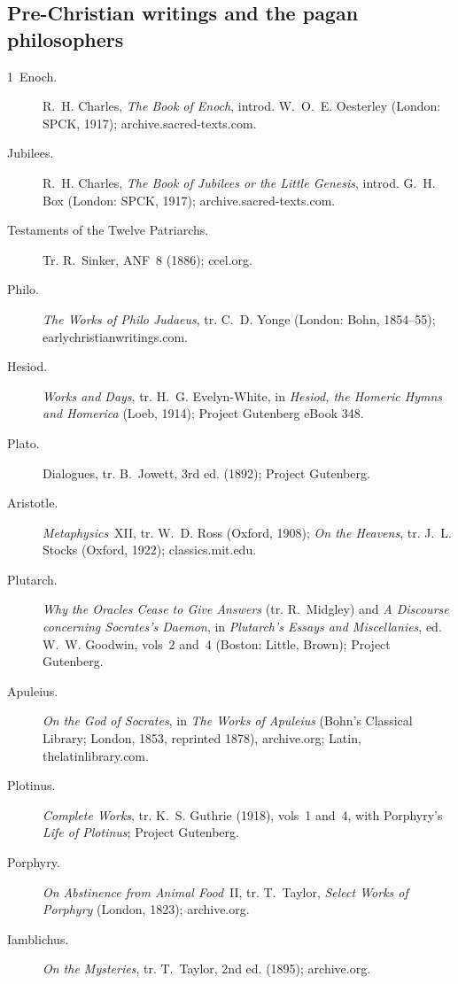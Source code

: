 \subsection*{Pre-Christian writings and the pagan philosophers}
\begin{description}
\item[1~Enoch.] R.~H. Charles, \emph{The Book of Enoch}, introd.
  W.~O.~E. Oesterley (London: SPCK, 1917); archive.sacred-texts.com.
\item[Jubilees.] R.~H. Charles, \emph{The Book of Jubilees or the Little
  Genesis}, introd. G.~H. Box (London: SPCK, 1917); archive.sacred-texts.com.
\item[Testaments of the Twelve Patriarchs.] Tr. R.~Sinker, ANF~8 (1886);
  ccel.org.
\item[Philo.] \emph{The Works of Philo Judaeus}, tr. C.~D. Yonge (London:
  Bohn, 1854--55); earlychristianwritings.com.
\item[Hesiod.] \emph{Works and Days}, tr. H.~G. Evelyn-White, in
  \emph{Hesiod, the Homeric Hymns and Homerica} (Loeb, 1914); Project
  Gutenberg eBook 348.
\item[Plato.] Dialogues, tr. B.~Jowett, 3rd ed. (1892); Project Gutenberg.
\item[Aristotle.] \emph{Metaphysics}~XII, tr. W.~D. Ross (Oxford, 1908);
  \emph{On the Heavens}, tr. J.~L. Stocks (Oxford, 1922); classics.mit.edu.
\item[Plutarch.] \emph{Why the Oracles Cease to Give Answers} (tr.
  R.~Midgley) and \emph{A Discourse concerning Socrates's Daemon}, in
  \emph{Plutarch's Essays and Miscellanies}, ed. W.~W. Goodwin, vols~2
  and~4 (Boston: Little, Brown); Project Gutenberg.
\item[Apuleius.] \emph{On the God of Socrates}, in \emph{The Works of
  Apuleius} (Bohn's Classical Library; London, 1853, reprinted 1878),
  archive.org; Latin, thelatinlibrary.com.
\item[Plotinus.] \emph{Complete Works}, tr. K.~S. Guthrie (1918), vols~1
  and~4, with Porphyry's \emph{Life of Plotinus}; Project Gutenberg.
\item[Porphyry.] \emph{On Abstinence from Animal Food}~II, tr. T.~Taylor,
  \emph{Select Works of Porphyry} (London, 1823); archive.org.
\item[Iamblichus.] \emph{On the Mysteries}, tr. T.~Taylor, 2nd ed.
  (1895); archive.org.
\end{description}

